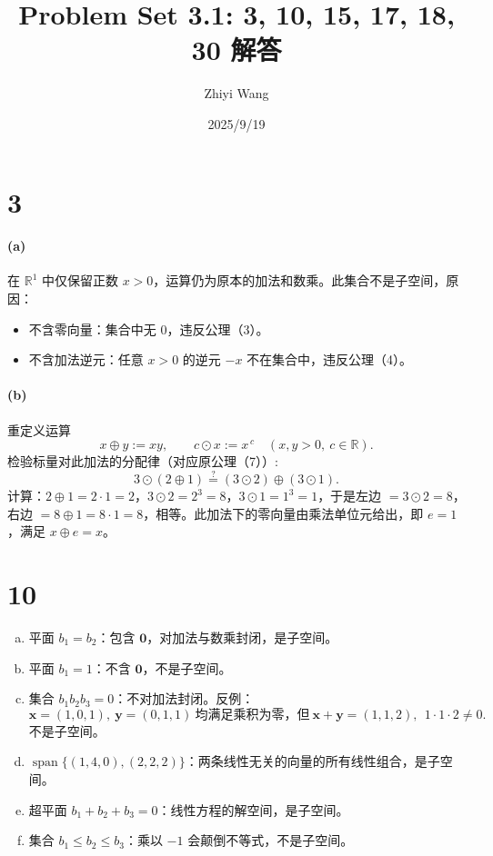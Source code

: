 \documentclass[12pt]{ctexart}
\title{Problem Set 3.1: 3, 10, 15, 17, 18, 30 解答}
\author{Zhiyi Wang}
\date{2025/9/19}
\DeclareMathOperator{\Span}{span}
\begin{document}
\maketitle

\section*{3}
\paragraph{(a)} 在 $\mathbb{R}^1$ 中仅保留正数 $x>0$，运算仍为原本的加法和数乘。此集合不是子空间，原因：
\begin{itemize}
  \item 不含零向量：集合中无 $0$，违反公理（3）。
  \item 不含加法逆元：任意 $x>0$ 的逆元 $-x$ 不在集合中，违反公理（4）。
\end{itemize}

\paragraph{(b)} 重定义运算
\[
x\oplus y := xy,\qquad c\odot x := x^{\,c}\quad(x,y>0,\ c\in\mathbb{R}).
\]
检验标量对此加法的分配律（对应原公理（7））:
\[
3\odot(2\oplus 1) \stackrel{?}{=} (3\odot 2)\oplus(3\odot 1).
\]
计算：$2\oplus 1=2\cdot 1=2$，$3\odot 2=2^3=8$，$3\odot 1=1^3=1$，于是左边 $=3\odot 2=8$，右边 $=8\oplus 1=8\cdot 1=8$，相等。此加法下的零向量由乘法单位元给出，即 $e=1$，满足 $x\oplus e=x$。

\section*{10}
\begin{enumerate}[(a)]
  \item 平面 $b_1=b_2$：包含 $\mathbf{0}$，对加法与数乘封闭，是子空间。
  \item 平面 $b_1=1$：不含 $\mathbf{0}$，不是子空间。
  \item 集合 $b_1b_2b_3=0$：不对加法封闭。反例：
  \[
  \mathbf{x}=(1,0,1),\ \mathbf{y}=(0,1,1)\ \text{均满足乘积为零，但}\ 
  \mathbf{x}+\mathbf{y}=(1,1,2),\ \ 1\cdot 1\cdot 2\ne 0.
  \]
  不是子空间。
  \item $\Span\{(1,4,0),(2,2,2)\}$：两条线性无关的向量的所有线性组合，是子空间。
  \item 超平面 $b_1+b_2+b_3=0$：线性方程的解空间，是子空间。
  \item 集合 $b_1\le b_2\le b_3$：乘以 $-1$ 会颠倒不等式，不是子空间。
\end{enumerate}
\end{document}
